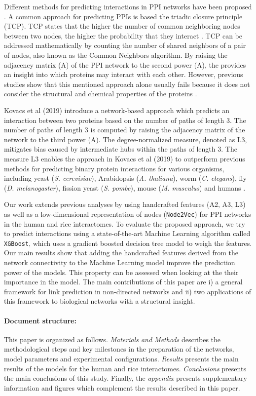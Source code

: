 Different methods for predicting interactions in PPI networks have
been proposed \cite{Chang2016PPI,Chen2019PPI,Kotlyar2015PPI}. A 
common approach for predicting PPIs is based the triadic closure principle
(TCP). TCP states that the higher the number of common neighboring
nodes between two nodes, the higher the probability that they interact
\cite{Goldberg2003SmallWorld}. TCP can be addressed mathematically
by counting the number of shared neighbors of a pair of nodes, also
known as the Common Neighbors algorithm. By raising the adjacency
matrix (A) of the PPI network to the second power (A\texttwosuperior ),
the provides an insight into which proteins may interact with each other. However, previous studies
show that this mentioned approach alone usually fails because it does not
consider the structural and chemical properties of the proteins \cite{Cannistraci2013Networks,Kovacs2019}.

Kovacs et al (2019) introduce a network-based approach which predicts
an interaction between two proteins based on the number of paths
of length 3. The number of paths of length 3 is computed by raising
the adjacency matrix of the network to the third power (A\textthreesuperior).
The degree-normalized measure, denoted as L3,  mitigates bias caused by
intermediate hubs within the paths of length 3. The measure L3 enables
the approach in Kovacs et al (2019) to outperform previous methods for predicting
binary protein interactions for various organisms, including yeast (\emph{S. cerevisiae}),
Arabidopsis (\emph{A. thaliana}), worm (\emph{C. elegans}), fly (\emph{D. melanogaster}),
fission yeast (\emph{S. pombe}), mouse (\emph{M. musculus}) and humans
\cite{Kovacs2019}.

Our work extends previous analyses by using handcrafted features (A2,
A3, L3) as well as a low-dimensional representation of nodes 
(\texttt{Node2Vec})\cite{Grover_2016} for PPI networks in the human and rice 
interactomes. To evaluate the proposed approach, we try to predict interactions
using a state-of-the-art Machine Learning algorithm called \texttt{XGBoost}\cite{2016ChenXGB},
which uses a gradient boosted decision tree model to weigh the features.
Our main results show that adding the handcrafted features derived from the
network connectivity to the Machine Learning model improve the prediction
power of the models. This property can be assessed when looking at the their
importance in the model.  The main contributions of this paper are i) a
general framework for link prediction in non-directed networks and ii) two
applications of this framework to biological networks with a structural
insight.

\paragraph*{Document structure:} This paper is organized as follows. \emph{Materials and Methods} describes
the methodological steps and key milestones in the preparation of
the networks, model parameters and experimental configurations.
\emph{Results} presents the main results of the models for the human and rice interactomes.
\emph{Conclusions} presents the main conclusions of this study. Finally, the \emph{appendix}
presents supplementary information and figures which complement the
results described in this paper.